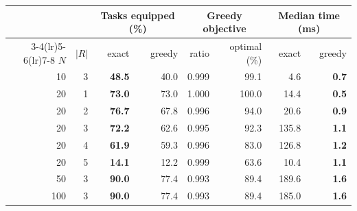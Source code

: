 \begin{tabular}{rrrrrrrr}\toprule
& & \multicolumn{2}{c}{Tasks equipped (\%)} & \multicolumn{2}{c}{Greedy objective} & \multicolumn{2}{c}{Median time (ms)} \\ \cmidrule(lr){3-4}\cmidrule(lr){5-6}\cmidrule(lr){7-8}
$N$ & $|R|$ & exact & greedy & ratio & optimal (\%) & exact & greedy \\ \midrule
10 & 3 & \textbf{48.5} & 40.0 & 0.999 & 99.1 & 4.6 & \textbf{0.7} \\
20 & 1 & \textbf{73.0} & 73.0 & 1.000 & 100.0 & 14.4 & \textbf{0.5} \\
20 & 2 & \textbf{76.7} & 67.8 & 0.996 & 94.0 & 20.6 & \textbf{0.9} \\
20 & 3 & \textbf{72.2} & 62.6 & 0.995 & 92.3 & 135.8 & \textbf{1.1} \\
20 & 4 & \textbf{61.9} & 59.3 & 0.996 & 83.0 & 126.8 & \textbf{1.2} \\
20 & 5 & \textbf{14.1} & 12.2 & 0.999 & 63.6 & 10.4 & \textbf{1.1} \\
50 & 3 & \textbf{90.0} & 77.4 & 0.993 & 89.4 & 189.6 & \textbf{1.6} \\
100 & 3 & \textbf{90.0} & 77.4 & 0.993 & 89.4 & 185.0 & \textbf{1.6} \\
\bottomrule\end{tabular}

